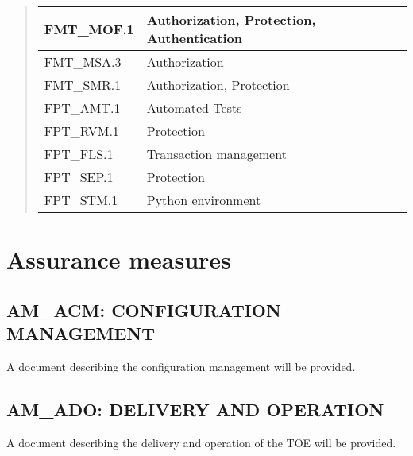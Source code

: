 \documentclass[12pt,english]{scrbook}
\begin{document}
\begin{quote}
\begin{longtable}[c]{|l|l|}
FMT{\_}MOF.1
 & 
Authorization, Protection, Authentication
 \\
\hline

FMT{\_}MSA.3
 & 
Authorization
 \\
\hline

FMT{\_}SMR.1
 & 
Authorization, Protection
 \\
\hline

FPT{\_}AMT.1
 & 
Automated Tests
 \\
\hline

FPT{\_}RVM.1
 & 
Protection
 \\
\hline

FPT{\_}FLS.1
 & 
Transaction management
 \\
\hline

FPT{\_}SEP.1
 & 
Protection
 \\
\hline

FPT{\_}STM.1
 & 
Python environment
 \\
\hline
\end{longtable}
\end{quote}





\section{Assurance measures}





\subsection{AM{\_}ACM: CONFIGURATION MANAGEMENT}

A document describing the configuration management will be provided.





\subsection{AM{\_}ADO: DELIVERY AND OPERATION}

A document describing the delivery and operation of the TOE will be provided.


\end{document}
